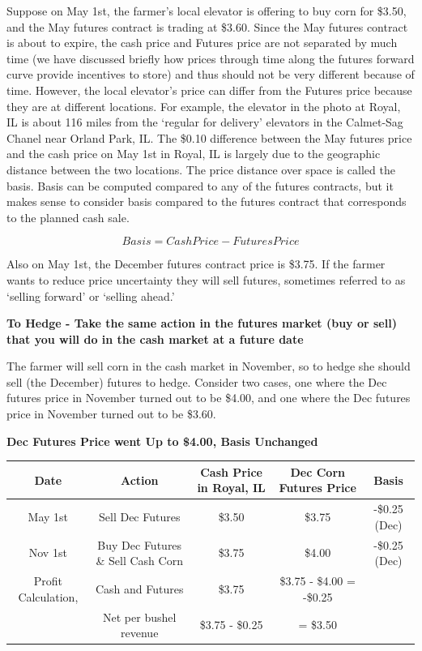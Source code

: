\documentclass[
]{book}
\begin{document}
Suppose on May 1st, the farmer's local elevator is offering to buy corn for \$3.50, and the May futures contract is trading at \$3.60. Since the May futures contract is about to expire, the cash price and Futures price are not separated by much time (we have discussed briefly how prices through time along the futures forward curve provide incentives to store) and thus should not be very different because of time. However, the local elevator's price can differ from the Futures price because they are at different locations. For example, the elevator in the photo at Royal, IL is about 116 miles from the `regular for delivery' elevators in the Calmet-Sag Chanel near Orland Park, IL. The \$0.10 difference between the May futures price and the cash price on May 1st in Royal, IL is largely due to the geographic distance between the two locations. The price distance over space is called the basis. Basis can be computed compared to any of the futures contracts, but it makes sense to consider basis compared to the futures contract that corresponds to the planned cash sale.

\[Basis = Cash Price - Futures Price\]

Also on May 1st, the December futures contract price is \$3.75. If the farmer wants to reduce price uncertainty they will sell futures, sometimes referred to as `selling forward' or `selling ahead.'

\textbf{To Hedge - Take the same action in the futures market (buy or sell) that you will do in the cash market at a future date}

The farmer will sell corn in the cash market in November, so to hedge she should sell (the December) futures to hedge. Consider two cases, one where the Dec futures price in November turned out to be \$4.00, and one where the Dec futures price in November turned out to be \$3.60.

\textbf{Dec Futures Price went Up to \$4.00, Basis Unchanged}

\begin{longtable}[]{@{}ccccc@{}}
\toprule
Date & Action & Cash Price in Royal, IL & Dec Corn Futures Price & Basis\tabularnewline
\midrule
\endhead
May 1st & Sell Dec Futures & \$3.50 & \$3.75 & -\$0.25 (Dec)\tabularnewline
Nov 1st & Buy Dec Futures \& Sell Cash Corn & \$3.75 & \$4.00 & -\$0.25 (Dec)\tabularnewline
Profit Calculation, & Cash and Futures & \$3.75 & \$3.75 - \$4.00 = -\$0.25 &\tabularnewline
& Net per bushel revenue & \$3.75 - \$0.25 & = \$3.50 &\tabularnewline
\bottomrule
\end{longtable}
\end{document}
